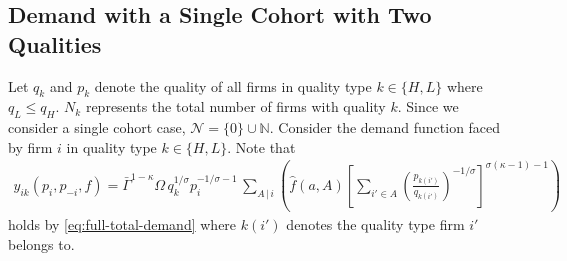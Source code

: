 \documentclass[12pt]{article}
\begin{document}
\subsection{Demand with a Single Cohort with Two Qualities}

Let $q_k$ and $p_k$ denote the quality of all firms in quality type $k \in \{H, L\}$ where $q_L \leq q_H$. $N_k$ represents the total number of firms with quality $k$. Since we consider a single cohort case, $\mathcal{N} = \{0\} \cup \mathbb{N}$. Consider the demand function faced by firm $i$ in quality type $k \in \{H, L\}$. Note that 
\begin{align}
y_{ik}(p_i, p_{-i}, f)  = \bar{\Gamma}^{1-\kappa}\Omega \, q_k^{1/\sigma}p_i^{-1/\sigma - 1}\,\sum_{{A}\,|\, i}\left(\hat{f}(a,A)\left[\sum_{i'\in A}\left( \frac{p_{k(i')}}{q_{k(i')}}\right)^{-1/\sigma}\right]^{\sigma (\kappa - 1)-1}\right)\label{eq:full-total-demand-two-quality}
\end{align}
holds by \cref{eq:full-total-demand} where $k(i')$ denotes the quality type firm $i'$ belongs to. 
\end{document}
